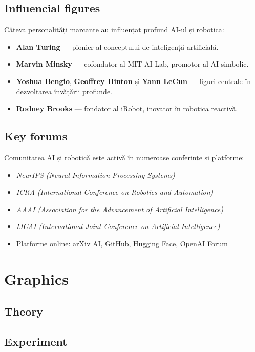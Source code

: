 \documentclass[12pt, letterpaper]{article}
\begin{document}
\subsection*{Influencial figures}
Câteva personalități marcante au influențat profund AI-ul și robotica:
\begin{itemize}
    \item \textbf{Alan Turing} — pionier al conceptului de inteligență artificială.
    \item \textbf{Marvin Minsky} — cofondator al MIT AI Lab, promotor al AI simbolic.
    \item \textbf{Yoshua Bengio}, \textbf{Geoffrey Hinton} și \textbf{Yann LeCun} — figuri centrale în dezvoltarea învățării profunde.
    \item \textbf{Rodney Brooks} — fondator al iRobot, inovator în robotica reactivă.
\end{itemize}

\subsection*{Key forums}
Comunitatea AI și robotică este activă în numeroase conferințe și platforme:
\begin{itemize}
    \item \textit{NeurIPS (Neural Information Processing Systems)}
    \item \textit{ICRA (International Conference on Robotics and Automation)}
    \item \textit{AAAI (Association for the Advancement of Artificial Intelligence)}
    \item \textit{IJCAI (International Joint Conference on Artificial Intelligence)}
    \item Platforme online: arXiv AI, GitHub, Hugging Face, OpenAI Forum
\end{itemize}


\newpage
\section{Graphics}
\subsection*{Theory}

\subsection*{Experiment}
\end{document}
